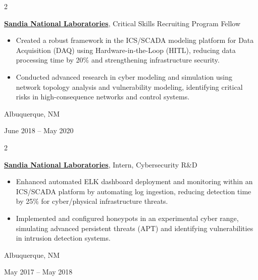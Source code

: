 \documentclass[10pt, a4paper]{article}
\newenvironment{highlights}{
    \begin{itemize}[
        topsep=0.1 cm,
        parsep=0.1 cm,
        partopsep=0pt,
        itemsep=0pt,
        leftmargin=0.2 cm + 10pt
    ]
}{
    \end{itemize}
} %
\newenvironment{twocolentry}[2][]{
    \onecolentry
    \def\secondColumn{#2}
    \setcolumnwidth{\fill, 4 cm}
    \begin{paracol}{2}
}{
    \switchcolumn \raggedleft \secondColumn
    \end{paracol}
    \endonecolentry
} %
\begin{document}
        \vspace{0.5 cm}

        \begin{twocolentry}{
            Albuquerque, NM

        June 2018 – May 2020
        }
            \textbf{\href{https://sandia.gov}{Sandia National Laboratories}}, Critical Skills Recruiting Program Fellow
            \begin{highlights}
                \item Created a robust framework in the ICS/SCADA modeling platform for Data Acquisition (DAQ) using Hardware-in-the-Loop (HITL), reducing data processing time by 20\% and strengthening infrastructure security.
                \item Conducted advanced research in cyber modeling and simulation using network topology analysis and vulnerability modeling, identifying critical risks in high-consequence networks and control systems.
            \end{highlights}
        \end{twocolentry}


        \vspace{0.5 cm}

        \begin{twocolentry}{
            Albuquerque, NM

        May 2017 – May 2018
        }
            \textbf{\href{https://sandia.gov}{Sandia National Laboratories}}, Intern, Cybersecurity R\&D
            \begin{highlights}
                \item Enhanced automated ELK dashboard deployment and monitoring within an ICS/SCADA platform by automating log ingestion, reducing detection time by 25\% for cyber/physical infrastructure threats.
                \item Implemented and configured honeypots in an experimental cyber range, simulating advanced persistent threats (APT) and identifying vulnerabilities in intrusion detection systems.
            \end{highlights}
        \end{twocolentry}


        \vspace{0.5 cm}
\end{document}
